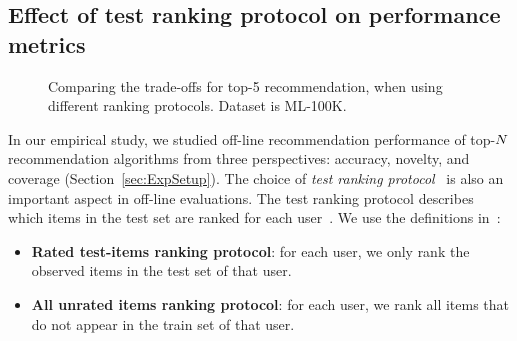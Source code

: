 \newpage
\subsection{Effect of test ranking protocol on performance metrics}
\label{test-protocol-effect}

\begin{figure}[t]
\centering





\caption{Comparing the trade-offs  for top-5 recommendation, when using different ranking protocols. Dataset is ML-100K.}

\label{fig:CP-LC-tradeoffs-ml-100k}
\end{figure}



In our empirical study, we studied off-line recommendation performance of top-$N$ recommendation algorithms from three perspectives: accuracy, novelty, and coverage (Section~\ref{sec:ExpSetup}). The  choice of \emph{test ranking protocol}~\cite{steck2013evaluation} is also an important aspect in off-line evaluations. The  test ranking protocol describes which items in the test set are ranked for each user~\cite{steck2013evaluation}. We use the definitions in~\cite{steck2013evaluation}: 
\begin{itemize}
\item \textbf{Rated test-items ranking protocol}: for each user, we only rank  the observed items in the test set of  that user. %
\item \textbf{All unrated items ranking protocol}: for each user, we rank all items that do not appear in the train set of that user.
\end{itemize}

